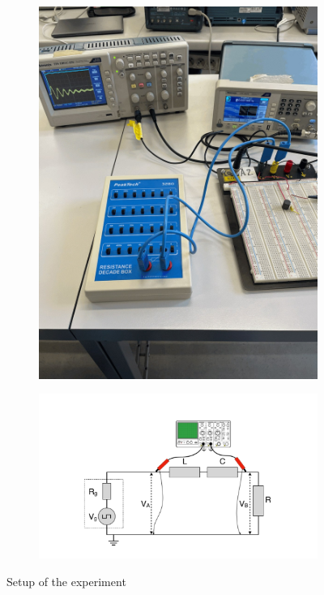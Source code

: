 \documentclass[notitlepage]{report}
\numberwithin{equation}{section}
\theoremstyle{plain}
\theoremstyle{definition}
\theoremstyle{remark}
\begin{document}
\begin{figure}[h!]
\begin{subfigure}[h]{0.45\textwidth}
        \includegraphics[width=\textwidth]{figures/RLC_setup_2.jpg}\caption{}\label{fig:setup1.22}
    \end{subfigure}
    \begin{subfigure}[h]{\textwidth}
        \includegraphics[width=\textwidth]{figures/diagram_RLC.png}\caption{}\label{fig:setup1.diag}
    \end{subfigure}
    \caption{Setup of the experiment}\label{fig:setup-rlc}
\end{figure}
\end{document}
